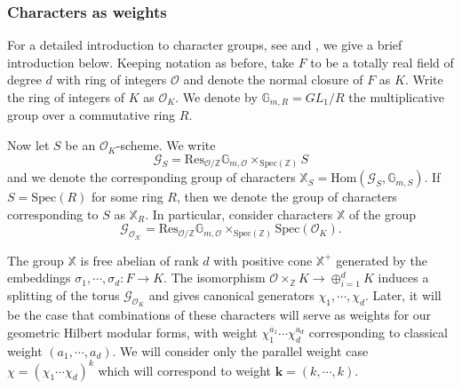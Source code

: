 \documentclass[a4paper,oneside]{amsart}
\theoremstyle{plain}
\theoremstyle{definition}
\begin{document}
\subsubsection{Characters as weights}
For a detailed introduction to character groups, see \cite[\S 1.1]{goren} and \cite[\S2,4]{andreattagoren}, we give a brief introduction below. Keeping notation as before, take $F$ to be a totally real field of degree $d$ with ring of integers $\mathcal{O}$ and denote the normal closure of $F$ as $K$. Write the ring of integers of $K$ as $\mathcal{O}_{K}$. We denote by $\mathbb{G}_{m,R} = GL_1 / R$ the multiplicative group over a commutative ring $R$. 

Now let $S$ be an $\mathcal{O}_K$-scheme. We write 
\begin{equation*}
    \mathcal{G}_S = \text{Res}_{\mathcal{O}/\mathbb{Z}}\mathbb{G}_{m,\mathcal{O}} \times_{\text{Spec}(\mathbb{Z})} S
\end{equation*}
and we denote the corresponding group of characters $\mathbb{X}_S = \text{Hom}(\mathcal{G}_S, \mathbb{G}_{m,S})$. If $S=\text{Spec}(R)$ for some ring $R$, then we denote the group of characters corresponding to $S$ as $\mathbb{X}_R$. 
In particular, consider characters
$\mathbb{X}$ of the group 
\begin{equation*}
\mathcal{G}_\mathcal{O_K}=\text{Res}_{\mathcal{O}/\mathbb{Z}}\mathbb{G}_{m,\mathcal{O}} \times_{\text{Spec}(\mathbb{Z})} \text{Spec}(\mathcal{O}_K). 
\end{equation*}

The group $\mathbb{X}$ is free abelian of rank $d$ with positive cone $\mathbb{X}^+$ generated by the embeddings $\sigma_1, \cdots, \sigma_d : F \rightarrow K$. The isomorphism $\mathcal{O}\times_\mathbb{Z} K \rightarrow \oplus_{i=1}^d K$ induces a splitting of the torus $\mathcal{G}_{\mathcal{O}_K}$ and gives canonical generators $\chi_1, \cdots , \chi_d$. Later, it will be the case that combinations of these characters will serve as weights for our geometric Hilbert modular forms, with weight $\chi_1^{a_1}\cdots \chi_d^{a_d}$ corresponding to classical weight $(a_1, \cdots , a_d)$. We will consider only the parallel weight case $\chi=(\chi_1\cdots \chi_d)^k$ which will correspond to weight $\textbf{k}=(k, \cdots, k)$.
\end{document}
